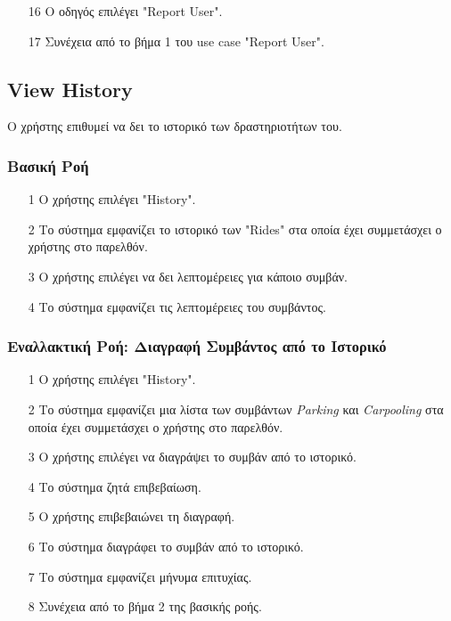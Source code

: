 \begin{enumerate}
    \item[16] Ο οδηγός επιλέγει "Report User".
    \item[17] Συνέχεια από το βήμα 1 του use case "Report User".
\end{enumerate}

\newpage

\subsection{View History}
\label{uc:view-history}

Ο χρήστης επιθυμεί να δει το ιστορικό των δραστηριοτήτων του.

\subsubsection{Βασική Ροή}

\begin{enumerate}
    \item[1] Ο χρήστης επιλέγει "History".
    \item[2] Το σύστημα εμφανίζει το ιστορικό των "Rides" στα οποία έχει συμμετάσχει ο
        χρήστης στο παρελθόν.
    \item[3] Ο χρήστης επιλέγει να δει λεπτομέρειες για κάποιο συμβάν.
    \item[4] Το σύστημα εμφανίζει τις λεπτομέρειες του συμβάντος.
\end{enumerate}

\subsubsection{Εναλλακτική Ροή: Διαγραφή Συμβάντος από το Ιστορικό}

\begin{enumerate}
    \item[1] Ο χρήστης επιλέγει "History".
    \item[2] Το σύστημα εμφανίζει μια λίστα των συμβάντων \textit{Parking} και
        \textit{Carpooling} στα οποία έχει συμμετάσχει ο χρήστης στο παρελθόν.
    \item[3] Ο χρήστης επιλέγει να διαγράψει το συμβάν από το ιστορικό.
    \item[4] Το σύστημα ζητά επιβεβαίωση.
    \item[5] Ο χρήστης επιβεβαιώνει τη διαγραφή.
    \item[6] Το σύστημα διαγράφει το συμβάν από το ιστορικό.
    \item[7] Το σύστημα εμφανίζει μήνυμα επιτυχίας.
    \item[8] Συνέχεια από το βήμα 2 της βασικής ροής.
\end{enumerate}

